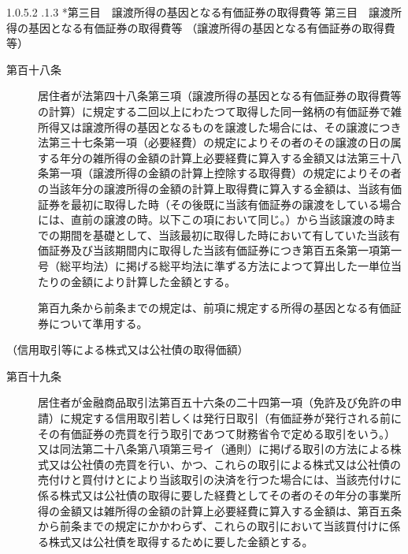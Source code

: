 \documentclass[twocolumn,a4j,10pt]{ltjtarticle}
\makeatletter
\newcommand{\subsubsubsection}{\@startsection{paragraph}{4}{\z@}%
  {1.0\Cvs \@plus.5\Cdp \@minus.2\Cdp}%
  {.1\Cvs \@plus.3\Cdp}%
  {\reset@font\sffamily\normalsize}
}
\makeatother
\begin{document}
\subsubsubsection*{第三目　譲渡所得の基因となる有価証券の取得費等}
{第三目　譲渡所得の基因となる有価証券の取得費等}
\noindent\hspace{10pt}（譲渡所得の基因となる有価証券の取得費等）
\begin{description}
\item[第百十八条]居住者が法第四十八条第三項（譲渡所得の基因となる有価証券の取得費等の計算）に規定する二回以上にわたつて取得した同一銘柄の有価証券で雑所得又は譲渡所得の基因となるものを譲渡した場合には、その譲渡につき法第三十七条第一項（必要経費）の規定によりその者のその譲渡の日の属する年分の雑所得の金額の計算上必要経費に算入する金額又は法第三十八条第一項（譲渡所得の金額の計算上控除する取得費）の規定によりその者の当該年分の譲渡所得の金額の計算上取得費に算入する金額は、当該有価証券を最初に取得した時（その後既に当該有価証券の譲渡をしている場合には、直前の譲渡の時。以下この項において同じ。）から当該譲渡の時までの期間を基礎として、当該最初に取得した時において有していた当該有価証券及び当該期間内に取得した当該有価証券につき第百五条第一項第一号（総平均法）に掲げる総平均法に準ずる方法によつて算出した一単位当たりの金額により計算した金額とする。
\item[]第百九条から前条までの規定は、前項に規定する所得の基因となる有価証券について準用する。
\end{description}
\noindent\hspace{10pt}（信用取引等による株式又は公社債の取得価額）
\begin{description}
\item[第百十九条]居住者が金融商品取引法第百五十六条の二十四第一項（免許及び免許の申請）に規定する信用取引若しくは発行日取引（有価証券が発行される前にその有価証券の売買を行う取引であつて財務省令で定める取引をいう。）又は同法第二十八条第八項第三号イ（通則）に掲げる取引の方法による株式又は公社債の売買を行い、かつ、これらの取引による株式又は公社債の売付けと買付けとにより当該取引の決済を行つた場合には、当該売付けに係る株式又は公社債の取得に要した経費としてその者のその年分の事業所得の金額又は雑所得の金額の計算上必要経費に算入する金額は、第百五条から前条までの規定にかかわらず、これらの取引において当該買付けに係る株式又は公社債を取得するために要した金額とする。
\end{description}
\end{document}
